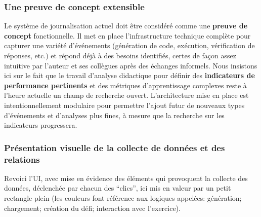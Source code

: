 \documentclass[11pt,a4paper]{article}
\begin{document}
\subsubsection{Une preuve de concept extensible}
Le système de journalisation actuel doit être considéré comme une \textbf{preuve de concept} fonctionnelle. Il met en place l'infrastructure technique complète pour capturer une variété d'événements (génération de code, exécution, vérification de réponses, etc.) et répond déjà à des besoins identifiés, certes de façon assez intuitive par l'auteur et ses collègues après des échanges informels. Nous insistons ici sur le fait que le travail d'analyse didactique pour définir des \textbf{indicateurs de performance pertinents} et des métriques d'apprentissage complexes reste à l'heure actuelle un champ de recherche ouvert. L'architecture mise en place est intentionnellement modulaire pour permettre l'ajout futur de nouveaux types d'événements et d'analyses plus fines, à mesure que la recherche sur les indicateurs progressera.

\subsubsection{Présentation visuelle de la collecte de données et des relations}
Revoici l'UI, avec mise en évidence des éléments qui provoquent la collecte des données, déclenchée par chacun des ``clics'', ici mis en valeur par un petit rectangle plein (les couleurs font référence aux logiques appelées: génération; chargement; création du défi; interaction avec l'exercice).
\end{document}
